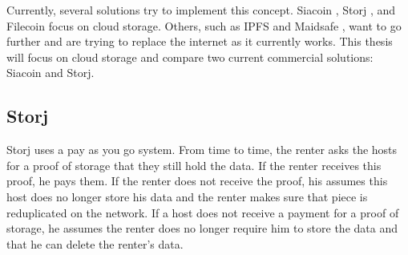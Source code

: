 Currently, several solutions try to implement this concept. Siacoin \cite{siacoin}, Storj \cite{storj}, and Filecoin \cite{filecoin} focus on cloud storage. Others, such as IPFS \cite{ipfs} and Maidsafe \cite{maidsafe}, want to go further and are trying to replace the internet as it currently works. This thesis will focus on cloud storage and compare two current commercial solutions: Siacoin and Storj.


\subsection{Storj}

\iffalse
# storj

- storj: uses a pay as you go system. every now and then you ask your storage providers for a proof that they are still holding your data. if you receive this proof, you pay them. If you do not receive a proof, you can assume this data is lost and make sure that piece of your date is reduplicated on the network. if a storage provider does not get paid for his proof, he can assume the user does not longer require him to store the data allowing him to delete this shard. 

- There are still some issues though: 
  - hosts take a risk when storing data, as they are never sure they will be paid. in the most extreme case, a malicious host might store a lot of data on the network, but never pay the first proof of storage, wasting this storage space. This effectively executes a denial of service attack on the network.
  - hosts do have no cost of not providing a proof of storage. 
  this makes the network very vulnerable to a sybil attack \ref{sybil-attack}. in which one malicious agent pretends to be several hosts at same time, at no cost. renters might think their data is secure, as it is duplicated over several hosts. However, the one malicious agent can turn off all his hosts, effectively destroying the stored data.


\fi


Storj uses a pay as you go system. From time to time, the renter asks the hosts for a proof of storage that they still hold the data. If the renter receives this proof, he pays them. If the renter does not receive the proof, his assumes this host does no longer store his data and the renter makes sure that piece is reduplicated on the network. If a host does not receive a payment for a proof of storage, he assumes the renter does no longer require him to store the data and that he can delete the renter's data. \cite{storj}

